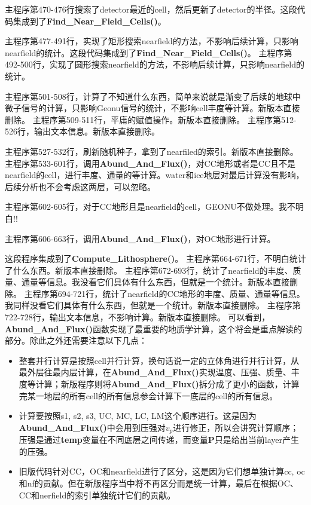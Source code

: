 		\begin{GCBox}[title = 探测器信息处理]{}
			主程序第470-476行搜索了detector最近的cell，然后更新了detector的半径。这段代码集成到了\textbf{Find\_Near\_Field\_Cells()}。
		\end{GCBox}
		\begin{GCBox}[title = nearfiled的搜索]{}
			主程序第477-491行，实现了矩形搜索nearfield的方法，不影响后续计算，只影响nearfield的统计。这段代码集成到了\textbf{Find\_Near\_Field\_Cells()}。
		\tcbline
			主程序第492-500行，实现了圆形搜索nearfield的方法，不影响后续计算，只影响nearfield的统计。
		\end{GCBox}
		\begin{GCBox}[title = 平庸的操作]{}
			主程序第501-508行，计算了不知道什么东西，简单来说就是渐变了后续的地球中微子信号的计算，只影响Geonu信号的统计，不影响cell丰度等计算。新版本直接删除。
		\tcbline
			主程序第509-511行，平庸的赋值操作。新版本直接删除。
		\tcbline
			主程序第512-526行，输出文本信息。新版本直接删除。
		\end{GCBox}
		\begin{GCBox}[title = Lithosphere的并行计算]{}
			主程序第527-532行，刷新随机种子，拿到了nearfiled的索引。新版本直接删除。
		\tcbline
			主程序第533-601行，调用\textbf{Abund\_And\_Flux()}，对CC地形或者是CC且不是nearfield的cell，进行丰度、通量的等计算。water和ice地层对最后计算没有影响，后续分析也不会考虑这两层，可以忽略。\par
			主程序第602-605行，对于CC地形且是nearfield的cell，GEONU不做处理。{\color{red}我不明白!!}\par
			主程序第606-663行，调用\textbf{Abund\_And\_Flux()}，对OC地形进行计算。\par
			这段程序集成到了\textbf{Compute\_Lithosphere()}。
		\tcbline
			主程序第664-671行，不明白统计了什么东西。新版本直接删除。
		\tcbline
			主程序第672-693行，统计了nearfield的丰度、质量、通量等信息。{\color{red}我没看它们具体有什么东西，但就是一个统计}。新版本直接删除。
		\tcbline
			主程序第694-721行，统计了nearfield的CC地形的丰度、质量、通量等信息。{\color{red}我同样没看它们具体有什么东西，但就是一个统计}。新版本直接删除。
		\tcbline
			主程序第722-728行，输出文本信息，不影响计算。新版本直接删除。
		\tcbline
			可以看到，\textbf{Abund\_And\_Flux()}函数实现了最重要的地质学计算，这个将会是重点解读的部分。除此之外还需要注意以下几点：	
				\begin{itemize}
					\item 整套并行计算是按照cell并行计算，换句话说一定的立体角进行并行计算，从最外层往最内层计算，在\textbf{Abund\_And\_Flux()}实现温度、压强、质量、丰度等计算；新版程序则将\textbf{Abund\_And\_Flux()}拆分成了更小的函数，计算完某一地层的所有cell的所有信息参会计算下一底层的cell的所有信息。
					\item 计算要按照s1, s2, s3, UC, MC, LC, LM这个顺序进行。这是因为\textbf{Abund\_And\_Flux()}中会用到压强对$v_p$进行修正，所以会讲究计算顺序；压强是通过\textbf{temp}变量在不同底层之间传递，而变量\textbf{P}只是给出当前layer产生的压强。
					\item 旧版代码针对CC，OC和nearfield进行了区分，这是因为它们想单独计算cc, oc和nf的贡献。但在新版程序当中将不再区分而是统一计算，最后在根据OC、CC和nerfield的索引单独统计它们的贡献。
				\end{itemize}
		\end{GCBox}

